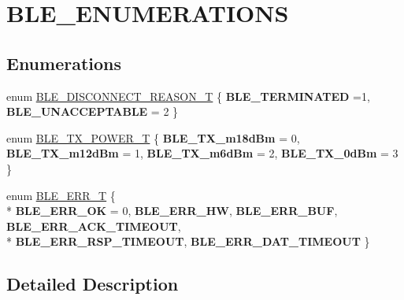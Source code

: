 \hypertarget{group___b_l_e___e_n_u_m_e_r_a_t_i_o_n_s}{\section{B\-L\-E\-\_\-\-E\-N\-U\-M\-E\-R\-A\-T\-I\-O\-N\-S}
\label{group___b_l_e___e_n_u_m_e_r_a_t_i_o_n_s}
}
\subsection*{Enumerations}
\begin{DoxyCompactItemize}
\item 
enum \hyperlink{group___b_l_e___e_n_u_m_e_r_a_t_i_o_n_s_gafdc7d73c1364c4d42f80cfdc702de294}{B\-L\-E\-\_\-\-D\-I\-S\-C\-O\-N\-N\-E\-C\-T\-\_\-\-R\-E\-A\-S\-O\-N\-\_\-\-T} \{ {\bfseries B\-L\-E\-\_\-\-T\-E\-R\-M\-I\-N\-A\-T\-E\-D} =1, 
{\bfseries B\-L\-E\-\_\-\-U\-N\-A\-C\-C\-E\-P\-T\-A\-B\-L\-E} = 2
 \}
\item 
enum \hyperlink{group___b_l_e___e_n_u_m_e_r_a_t_i_o_n_s_ga3b6d6db9e13e93ae21f2a383d9903617}{B\-L\-E\-\_\-\-T\-X\-\_\-\-P\-O\-W\-E\-R\-\_\-\-T} \{ {\bfseries B\-L\-E\-\_\-\-T\-X\-\_\-m18d\-Bm} = 0, 
{\bfseries B\-L\-E\-\_\-\-T\-X\-\_\-m12d\-Bm} = 1, 
{\bfseries B\-L\-E\-\_\-\-T\-X\-\_\-m6d\-Bm} = 2, 
{\bfseries B\-L\-E\-\_\-\-T\-X\-\_\-0d\-Bm} = 3
 \}
\item 
enum \hyperlink{group___b_l_e___e_n_u_m_e_r_a_t_i_o_n_s_ga6c00522f6a8c33135ee0414877d42c04}{B\-L\-E\-\_\-\-E\-R\-R\-\_\-\-T} \{ \\*
{\bfseries B\-L\-E\-\_\-\-E\-R\-R\-\_\-\-O\-K} = 0, 
{\bfseries B\-L\-E\-\_\-\-E\-R\-R\-\_\-\-H\-W}, 
{\bfseries B\-L\-E\-\_\-\-E\-R\-R\-\_\-\-B\-U\-F}, 
{\bfseries B\-L\-E\-\_\-\-E\-R\-R\-\_\-\-A\-C\-K\-\_\-\-T\-I\-M\-E\-O\-U\-T}, 
\\*
{\bfseries B\-L\-E\-\_\-\-E\-R\-R\-\_\-\-R\-S\-P\-\_\-\-T\-I\-M\-E\-O\-U\-T}, 
{\bfseries B\-L\-E\-\_\-\-E\-R\-R\-\_\-\-D\-A\-T\-\_\-\-T\-I\-M\-E\-O\-U\-T}
 \}
\end{DoxyCompactItemize}


\subsection{Detailed Description}


